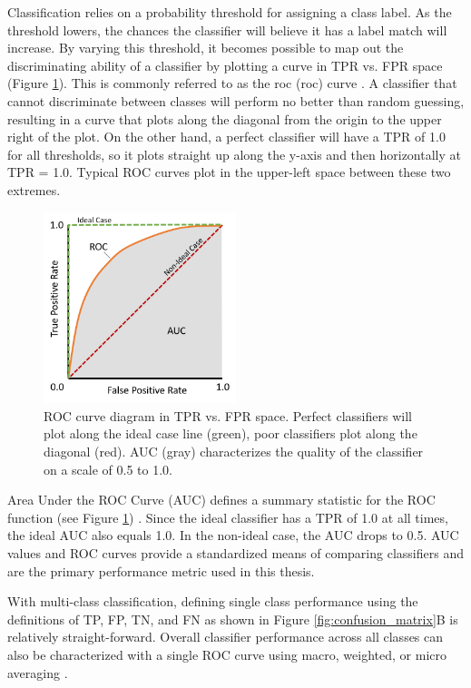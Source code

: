Classification relies on a probability threshold for assigning a class label. As the threshold lowers, the chances the classifier will believe it has a label match will increase. By varying this threshold, it becomes possible to map out the discriminating ability of a classifier by plotting a curve in TPR vs. FPR space (Figure \ref{fig:roc}). This is commonly referred to as the \acrlong{roc} (\acrshort{roc}) curve \citep{fawcett_introduction_2006}. A classifier that cannot discriminate between classes will perform no better than random guessing, resulting in a curve that plots along the diagonal from the origin to the upper right of the plot. On the other hand, a perfect classifier will have a TPR of 1.0 for all thresholds, so it plots straight up along the y-axis and then horizontally at TPR = 1.0. Typical ROC curves plot in the upper-left space between these two extremes.

\begin{figure}[!htp]
\centering
\includegraphics[width=0.5\textwidth]{templates/images/Figure-ROC_AUC_Diagram.png}
\caption[Receiver Operating Characteristic diagram]{ROC curve diagram in TPR vs. FPR space. Perfect classifiers will plot along the ideal case line (green), poor classifiers plot along the diagonal (red). AUC (gray) characterizes the quality of the classifier on a scale of 0.5 to 1.0.}
\label{fig:roc}
\end{figure}

Area Under the ROC Curve (AUC) defines a summary statistic for the ROC function (see Figure \ref{fig:roc}) \citep{fawcett_introduction_2006}. Since the ideal classifier has a TPR of 1.0 at all times, the ideal AUC also equals 1.0. In the non-ideal case, the AUC drops to 0.5. AUC values and ROC curves provide a standardized means of comparing classifiers and are the primary performance metric used in this thesis.

With multi-class classification, defining single class performance using the definitions of TP, FP, TN, and FN as shown in Figure \ref{fig:confusion_matrix}B is relatively straight-forward. Overall classifier performance across all classes can also be characterized with a single ROC curve using macro, weighted, or micro averaging \citep{scikit-learn_sklearnmetricsroc_auc_score_2021}.

